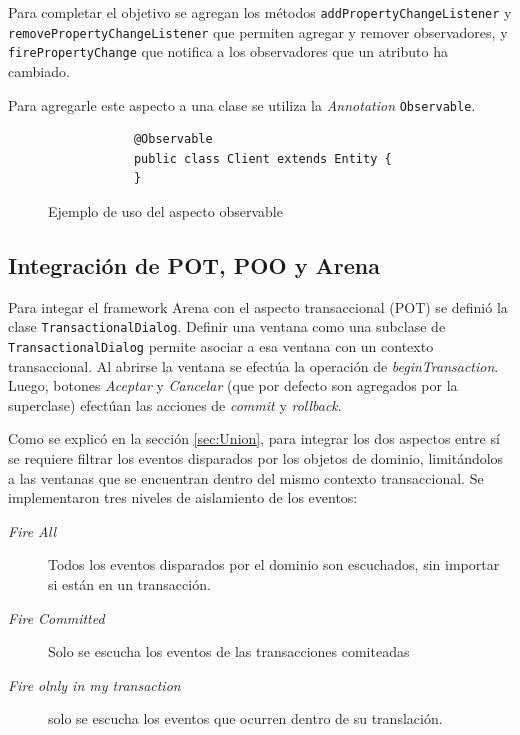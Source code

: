 		Para completar el objetivo se agregan los métodos 
		\lstinline|addPropertyChangeListener| y
		\lstinline|removePropertyChangeListener| que permiten agregar 
		y remover observadores, y \lstinline|firePropertyChange|
		que notifica a los observadores que un atributo ha cambiado.
		
		Para agregarle este aspecto a una clase se utiliza la \emph{Annotation}
		\lstinline|Observable|.
		
	\begin{figure}[h]
		\begin{lstlisting} 
			@Observable
			public class Client extends Entity {
			}
		\end{lstlisting}
		\caption{Ejemplo de uso del aspecto observable}
		\label{poo}
	\end{figure}  
	
\subsection{Integración de POT, POO y Arena}
	Para integar el framework Arena con el aspecto transaccional (POT) se definió
	la clase \lstinline|TransactionalDialog|. 
	Definir una ventana como una subclase de
	\lstinline|TransactionalDialog| permite asociar a esa ventana con un contexto
	transaccional.
	Al abrirse la ventana se efectúa la operación de \emph{beginTransaction}.
	Luego, botones \emph{Aceptar} y \emph{Cancelar} (que por defecto son agregados
	por la superclase) efectúan las acciones de \emph{commit} y
	\emph{rollback}.
	
	Como se explicó en la sección \ref{sec:Union}, para integrar los dos aspectos
	entre sí se requiere filtrar los eventos disparados por los objetos de dominio, 
	limitándolos a las ventanas que se encuentran dentro del mismo contexto
	transaccional. 
	Se implementaron tres niveles de aislamiento de los eventos:
	\begin{description}
		\item[\emph{Fire All}] Todos los eventos disparados por el dominio son
		escuchados, sin importar si están en un transacción.
	
		\item[\emph{Fire Committed}] Solo se escucha los eventos de las transacciones
			comiteadas
		
		\item[\emph{Fire olnly in my transaction}] solo se escucha los eventos que
			ocurren dentro de su translación.
	 \end{description}
	 
